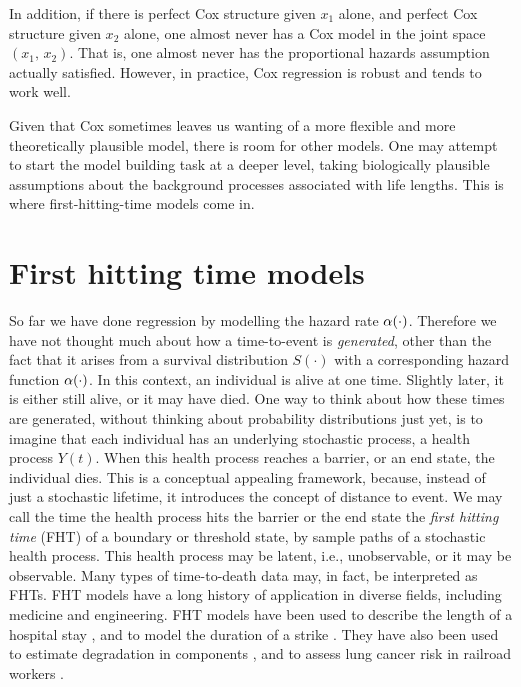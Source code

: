 In addition, if there is perfect Cox structure given $x_1$ alone, and perfect Cox structure given $x_2$ alone, one almost never has a Cox model in the joint space $(x_1,\,x_2)$.
That is, one almost never has the proportional hazards assumption actually satisfied.
However, in practice, Cox regression is robust and tends to work well.

Given that Cox sometimes leaves us wanting of a more flexible and more theoretically plausible model, there is room for other models.
One may attempt to start the model building task at a deeper level, taking biologically plausible assumptions about the background processes associated with life lengths.
This is where first-hitting-time models come in.

\section{First hitting time models}\label{sec:FHT}
So far we have done regression by modelling the hazard rate $\alpha(\cdot)$.
Therefore we have not thought much about how a time-to-event is \textit{generated}, other than the fact that it arises from a survival distribution $S(\cdot)$ with a corresponding hazard function $\alpha(\cdot)$.
In this context, an individual is alive at one time.
Slightly later, it is either still alive, or it may have died.
One way to think about how these times are generated, without thinking about probability distributions just yet, is to imagine that each individual has an underlying stochastic process, a health process $Y(t)$.
When this health process reaches a barrier, or an end state, the individual dies.
This is a conceptual appealing framework, because, instead of just a stochastic lifetime, it introduces
the concept of distance to event.
We may call the time the health process hits the barrier or the end state the \textit{first hitting time} (FHT) of a boundary or threshold state, by sample paths of a stochastic health process.
This health process may be latent, i.e., unobservable, or it may be observable.
Many types of time-to-death data may, in fact, be interpreted as FHTs.
FHT models have a long history of application in diverse fields, including medicine and engineering.
FHT models have been used to describe the length of a hospital stay \citep{whitmore1975,eaton-whitmore}, and to model the duration of a strike \citep{lancaster}.
They have also been used to estimate degradation in components \citep{whitmore1995}, and to assess lung cancer risk in railroad workers \citep{leewhitmore2004}.

